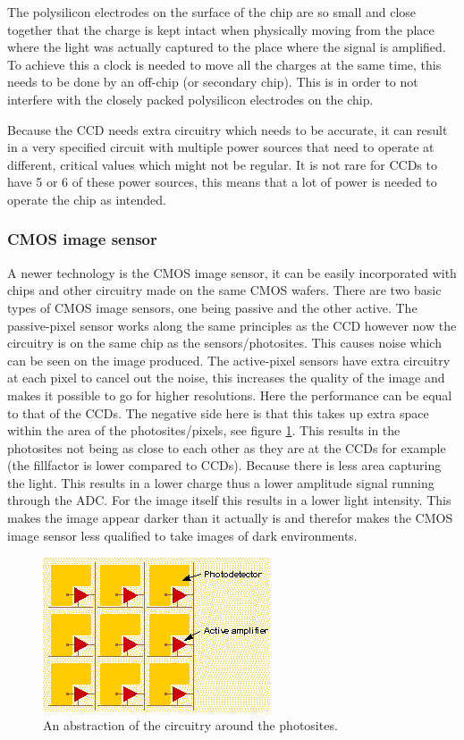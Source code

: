 \documentclass{article}
\begin{document}
The polysilicon electrodes on the surface of the chip are so small and close together that the charge is kept intact when physically moving from the place where the light was actually captured to the place where the signal is amplified. To achieve this a clock is needed to move all the charges at the same time, this needs to be done by an off-chip (or secondary chip). This is in order to not interfere with the closely packed polysilicon electrodes on the chip. 

Because the CCD needs extra circuitry which needs to be accurate, it can result in a very specified circuit with multiple power sources that need to operate at different, critical values which might not be regular. It is not rare for CCDs to have 5 or 6 of these power sources, this means that a lot of power is needed to operate the chip as intended.


\subsubsection{CMOS image sensor}

A newer technology is the CMOS image sensor, it can be easily incorporated with chips and other circuitry made on the same CMOS wafers. There are two basic types of CMOS image sensors, one being passive and the other active. The passive-pixel sensor works along the same principles as the CCD however now the circuitry is on the same chip as the sensors/photosites. This causes noise which can be seen on the image produced. The active-pixel sensors have extra circuitry at each pixel to cancel out the noise, this increases the quality of the image and makes it possible to go for higher resolutions. Here the performance can be equal to that of the CCDs. The negative side here is that this takes up extra space within the area of the photosites/pixels, see figure \ref{cmos1}. This results in the photosites not being as close to each other as they are at the CCDs for example (the fillfactor is lower compared to CCDs). Because there is less area capturing the light. This results in a lower charge thus a lower amplitude signal running through the ADC. For the image itself this results in a lower light intensity. This makes the image appear darker than it actually is and therefor makes the CMOS image sensor  less qualified to take images of dark environments.

\begin{figure}[H]
	\centering
	\includegraphics[scale=1]{figures/fillfactor}
	\caption{An abstraction of the circuitry around the photosites. }
	\label{cmos1}
\end{figure}
\end{document}
